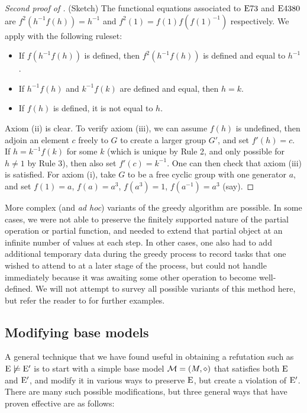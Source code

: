 \begin{proof}[Second proof of ] (Sketch)  The functional equations associated to $\mathrm{E}73$ and $\mathrm{E}4380$ are
$f^2(h^{-1} f(h)) =h^{-1}$ and $f^2(1) = f(1) f(f(1)^{-1})$ respectively.  We apply  with the following ruleset:
\begin{itemize}
  \item[1.]  If $f(h^{-1} f(h))$ is defined, then $f^2(h^{-1} f(h))$ is defined and equal to $h^{-1}$.
  \item[2.]  If $h^{-1} f(h)$ and $k^{-1} f(k)$ are defined and equal, then $h=k$.
  \item[3.]  If $f(h)$ is defined, it is not equal to $h$.
\end{itemize}
Axiom (ii) is clear.  To verify axiom (iii), we can assume $f(h)$ is undefined, then adjoin an element $c$ freely to $G$ to create a larger group $G'$, and set $f'(h) = c$.  If $h = k^{-1} f(k)$ for some $k$ (which is unique by Rule 2, and only possible for $h \neq 1$ by Rule 3), then also set $f'(c) = k^{-1}$.  One can then check that axiom (iii) is satisfied.  For axiom (i), take $G$ to be a free cyclic group with one generator $a$, and set $f(1) = a$, $f(a) = a^3$, $f(a^3) = 1$, $f(a^{-1}) = a^3$ (say).
\end{proof}

More complex (and \emph{ad hoc}) variants of the greedy algorithm are possible.  In some cases, we were not able to preserve the finitely supported nature of the partial operation or partial function, and needed to extend that partial object at an infinite number of values at each step.  In other cases, one also had to add additional temporary data during the greedy process to record tasks that one wished to attend to at a later stage of the process, but could not handle immediately because it was awaiting some other operation to become well-defined.  We will not attempt to survey all possible variants of this method here, but refer the reader to \cite[Sections~7.4 and~14.2, and Chapters~16 and~18]{ETP_blueprint} for further examples.

\subsection{Modifying base models}\label{modify-base}

A general technique that we have found useful in obtaining a refutation such as $\mathrm{E} \not\models {\mathrm{E}'}$ is to start with a simple base model ${\mathcal{M}} = (M,\diamond)$ that satisfies both $\mathrm{E}$ and ${\mathrm{E}'}$, and modify it in various ways to preserve $\mathrm{E}$, but create a violation of ${\mathrm{E}'}$.  There are many such possible modifications, but three general ways that have proven effective are as follows:

